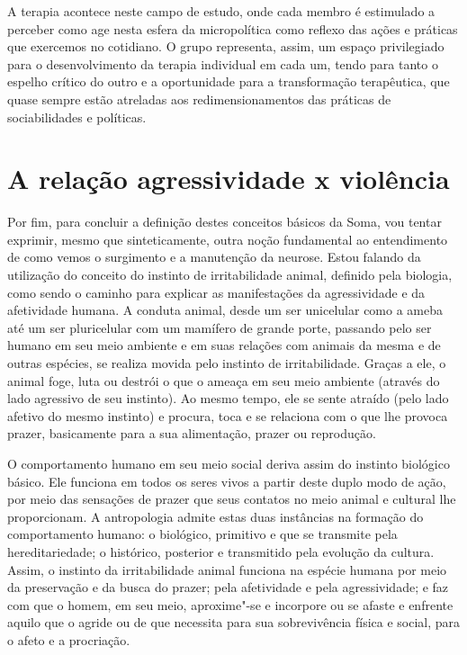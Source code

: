 A terapia acontece neste campo de estudo, onde cada membro é estimulado
a perceber como age nesta esfera da micropolítica como reflexo das
ações e práticas que exercemos no cotidiano. O grupo representa, assim,
um espaço privilegiado para o desenvolvimento da terapia individual em
cada um, tendo para tanto o espelho crítico do outro e a oportunidade
para a transformação terapêutica, que quase sempre estão atreladas aos
redimensionamentos das práticas de sociabilidades e políticas.

\section{A relação agressividade x violência}

Por fim, para concluir a definição destes conceitos básicos da Soma, vou
tentar exprimir, mesmo que sinteticamente, outra noção fundamental ao
entendimento de como vemos o surgimento e a manutenção da neurose. Estou
falando da utilização do conceito do instinto de irritabilidade animal,
definido pela biologia, como sendo o caminho para explicar as
manifestações da agressividade e da afetividade humana. A conduta
animal, desde um ser unicelular como a ameba até um ser pluricelular com
um mamífero de grande porte, passando pelo ser humano em seu meio
ambiente e em suas relações com animais da mesma e de outras espécies,
se realiza movida pelo instinto de irritabilidade. Graças a ele, o
animal foge, luta ou destrói o que o ameaça em seu meio ambiente
(através do lado agressivo de seu instinto). Ao mesmo tempo, ele se
sente atraído (pelo lado afetivo do mesmo instinto) e procura, toca e se
relaciona com o que lhe provoca prazer, basicamente para a sua
alimentação, prazer ou reprodução.

O comportamento humano em seu meio social deriva assim do instinto
biológico básico. Ele funciona em todos os seres vivos a partir deste
duplo modo de ação, por meio das sensações de prazer que seus contatos
no meio animal e cultural lhe proporcionam. A antropologia admite estas
duas instâncias na formação do comportamento humano: o biológico,
primitivo e que se transmite pela hereditariedade; o histórico,
posterior e transmitido pela evolução da cultura. Assim, o instinto da
irritabilidade animal funciona na espécie humana por meio da preservação
e da busca do prazer; pela afetividade e pela agressividade; e faz com
que o homem, em seu meio, aproxime"-se e incorpore ou se afaste e
enfrente aquilo que o agride ou de que necessita para sua sobrevivência
física e social, para o afeto e a procriação.

